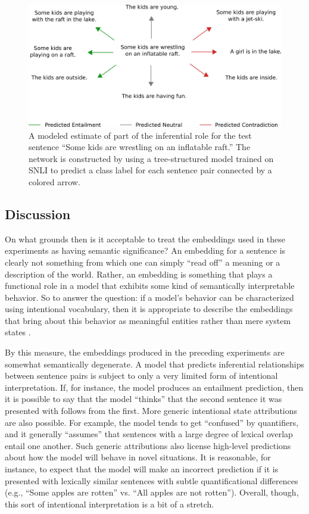 \begin{figure}
\centering
	\includegraphics[scale=0.53]{figures/inf-role.png}
	\caption{A modeled estimate of part of the inferential role for the test sentence ``Some kids are wrestling on an inflatable raft.'' The network is constructed by using a tree-structured model trained on SNLI to predict a class label for each sentence pair connected by a colored arrow.}\label{fig:infrole}
\end{figure}

\subsection{Discussion}

On what grounds then is it acceptable to treat the embeddings used in these experiments as having semantic significance? An embedding for a sentence is clearly not something from which one can simply ``read off'' a meaning or a description of the world. Rather, an embedding is something that plays a functional role in a model that exhibits some kind of semantically interpretable behavior. So to answer the question: if a model's behavior can be characterized using intentional vocabulary, then it is appropriate to describe the embeddings that bring about this behavior as meaningful entities rather than mere system states \citep[see][]{Dennett:1987}. 

By this measure, the embeddings produced in the preceding experiments are somewhat semantically degenerate. A model that predicts inferential relationships between sentence pairs is subject to only a very limited form of intentional interpretation. If, for instance, the model produces an entailment prediction, then it is possible to say that the model ``thinks'' that the second sentence it was presented with follows from the first. More generic intentional state attributions are also possible. For example, the model tends to get ``confused'' by quantifiers, and it generally ``assumes'' that sentences with a large degree of lexical overlap entail one another. Such generic attributions also license high-level predictions about how the model will behave in novel situations. It is reasonable, for instance, to expect that the model will make an incorrect prediction if it is presented with lexically similar sentences with subtle quantificational differences (e.g., ``Some apples are rotten'' vs. ``All apples are not rotten''). Overall, though, this sort of intentional interpretation is a bit of a stretch.

